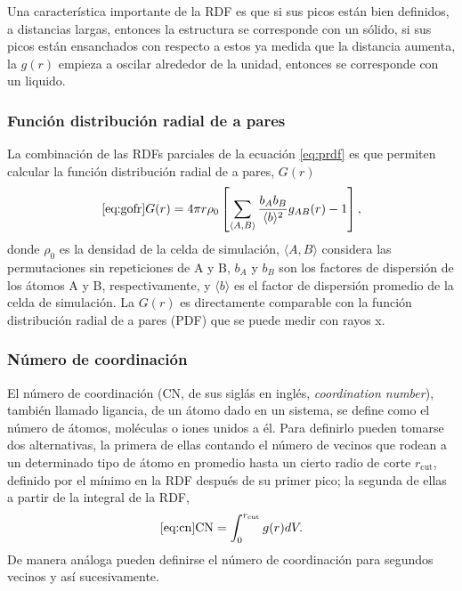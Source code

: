 Una característica importante de la RDF es que si sus picos están bien definidos,
a distancias largas, entonces la estructura se corresponde con un sólido, si sus 
picos están ensanchados con respecto a estos ya medida que la distancia aumenta, 
la $g(r)$ empieza a oscilar alrededor de la unidad, entonces se corresponde con 
un liquido.


\subsubsection{Función distribución radial de a pares}\label{ss:gofr}

La combinación de las RDFs parciales de la ecuación \ref{eq:prdf} es que permiten
calcular la función distribución radial de a pares, $G(r)$ \cite{billinge2019}
\begin{equation}\ref{eq:gofr}
    G(r) = 4 \pi r \rho_0 \left[\sum_{\langle A,B \rangle} \frac{b_A b_B}{\langle b\rangle^2} g_{AB}(r) - 1\right], 
\end{equation}
donde $\rho_0$ es la densidad de la celda de simulación, $\langle A, B \rangle$
considera las permutaciones sin repeticiones de A y B, $b_A$ y $b_B$ son los 
factores de dispersión de los átomos A y B, respectivamente, y $\langle b \rangle$
es el factor de dispersión promedio de la celda de simulación. La $G(r)$ es 
directamente comparable con la función distribución radial de a pares (PDF) que 
se puede medir con rayos x.


\subsubsection{Número de coordinación}\label{ss:cn}

El número de coordinación (CN, de sus siglás en inglés, \textit{coordination 
number}), también llamado ligancia, de un átomo dado en un sistema, se define 
como el número de átomos, moléculas o iones unidos a él. Para definirlo pueden 
tomarse dos alternativas, la primera de ellas contando el número de vecinos que 
rodean a un determinado tipo de átomo en promedio hasta un cierto radio de corte 
$r_{\text{cut}}$, definido por el mínimo en la RDF después de su primer pico; 
la segunda de ellas a partir de la integral de la RDF,
\begin{equation}\ref{eq:cn}
    \text{CN} = \int_0^{r_{\text{cut}}} g(r) dV.
\end{equation}
De manera análoga pueden definirse el número de coordinación para segundos 
vecinos y así sucesivamente.

